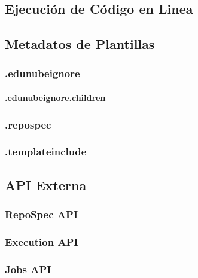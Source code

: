 \subsection{Ejecución de Código en Linea}

\subsection{Metadatos de Plantillas}
\subsubsection{.edunubeignore}
\paragraph{.edunubeignore.children}
\subsubsection{.repospec}
\subsubsection{.templateinclude}

\subsection{API Externa}
\subsubsection{RepoSpec API}
\subsubsection{Execution API}
\subsubsection{Jobs API}
